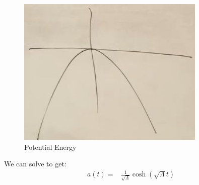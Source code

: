 \documentclass[]{article}
\begin{document}
 \begin{figure}[H]
 	\caption{Potential Energy}\label{fig:cosmo-5-pe}
 	\includegraphics[width=0.8\textwidth]{cosmo-5-pe}
 \end{figure}
 
 We can solve to get:
 \begin{align*}
 	a(t) =& \frac{1}{\sqrt{\Lambda}} \cosh {(\sqrt{\Lambda}t)}
 \end{align*}
 
\end{document}
